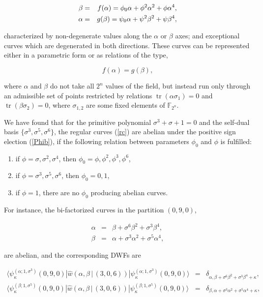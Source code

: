 \documentclass[quantumrep,article,submit,pdftex,moreauthors]{Definitions/mdpi}
\DeclareMathOperator{\tr}{tr}
\begin{document}
\begin{eqnarray}
  \beta &=& f(\alpha) = \phi_{0}\alpha +\phi^{2} \alpha^{2} + \phi \alpha^{4},
  \label{rc} \\
  \alpha &=& g(\beta) = \psi_{0}\alpha +\psi^{2} \beta^{2} + \psi \beta^{4}, 
  \notag
\end{eqnarray}

characterized by non-degenerate values along the $\alpha$ or $\beta$ axes; and
exceptional curves which are degenerated in both directions. These curves
can be represented either in a parametric form or as relations of the type,

\begin{equation*}
  f(\alpha) = g(\beta),
\end{equation*}

where $\alpha$ and $\beta$ do not take all $2^{n}$ values of the field, but
instead run only through an admissible set of points restricted by relations $
\tr(\alpha \sigma_{1}) = 0$ and $\tr(\beta \sigma_{2}) = 0$, where
$\sigma_{1,2}$ are some fixed elements of $\mathbb{F}_{2^{n}}$.

We have found that for the primitive polynomial $\sigma^{3} + \sigma + 1 = 0$
and the self-dual basis $\{\sigma^{3},\sigma^{5},\sigma^{6}\}$, the regular
curves (\ref{rc}) are abelian under the positive sign election (\ref{Phib}), if
the following relation between parameters $\phi_{0}$ and $\phi$ is fulfilled:

\begin{enumerate}
  \item if $\phi =\sigma, \sigma^{2}, \sigma^{4}$, then $\phi_{0} =
    \phi,\phi^{2},\phi^{3}, \phi^{6}$,
  \item if $\phi = \sigma^{3}, \sigma^{5}, \sigma^{6}$, then $\phi_{0}=0,1$,
  \item if $\phi = 1$, there are no $\phi_{0}$ producing abelian curves.
\end{enumerate}

For instance, the bi-factorized curves in the partition $(0,9,0)$,

\begin{eqnarray}
  \alpha &=& \beta + \sigma^{6} \beta^{2} + \sigma^{3}\beta^{4},
  \label{ac1} \\
  \beta &=& \alpha + \sigma^{3} \alpha^{2} + \sigma^{5}\alpha^{4},
  \label{ac2}
\end{eqnarray}

are abelian, and the corresponding DWFs are

\begin{eqnarray}
  \langle \psi_{\kappa}^{(\alpha ; 1,\sigma^{3})}(0,9,0)
  |\hat{w}\left(\alpha,\beta \, | \, (3,0,6)\right)
  |\psi_{\kappa}^{(\alpha ; 1,\sigma^{3})}(0,9,0)\rangle
  &=& \delta_{\alpha,\beta + \sigma^{6}\beta^{2} + \sigma^{3} \beta^{4} +
  \kappa}, \\
  \langle \psi_{\kappa }^{(\beta ; 1,\sigma^{5})}(0,9,0)
  |\hat{w}\left(\alpha,\beta \, | \, (3,0,6)\right)
  |\psi_{\kappa}^{(\beta ; 1,\sigma^{5})}(0,9,0)\rangle
  &=& \delta_{\beta,\alpha + \sigma^{3}\alpha^{2} + \sigma^{5} \alpha^{4} +
  \kappa },
  \label{ac2 delta}
\end{eqnarray}
\end{document}
